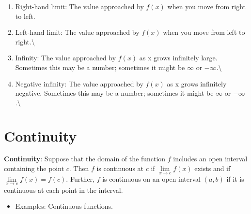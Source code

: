 \documentclass[]{book}
\providecommand{\tightlist}{%
  \setlength{\itemsep}{0pt}\setlength{\parskip}{0pt}}
\theoremstyle{definition}
\theoremstyle{definition}
\theoremstyle{definition}
\theoremstyle{remark}
\begin{document}
\begin{enumerate}
\def\labelenumi{\arabic{enumi}.}
\tightlist
\item
  Right-hand limit: The value approached by \(f(x)\) when you move from
  right to left.

  \begin{comment}
      \parbox[t]{2in}{Example:  $\lim\limits_{x\to 0^+} \sqrt{x} = 0$}\parbox[t]{1in}{\,  {\texttt{[image: sqrt.eps]}}}
      \end{comment}
\item
  Left-hand limit: The value approached by \(f(x)\) when you move from
  left to right.\textbackslash{}
\item
  Infinity: The value approached by \(f(x)\) as x grows infinitely
  large. Sometimes this may be a number; sometimes it might be
  \(\infty\) or \(-\infty\).\textbackslash{}
\item
  Negative infinity: The value approached by \(f(x)\) as x grows
  infinitely negative. Sometimes this may be a number; sometimes it
  might be \(\infty\) or \(-\infty\).\textbackslash{}
\end{enumerate}

\begin{comment}
\parbox[t]{2in}{Example:  $\lim\limits_{x\to \infty} 1/x = \lim\limits_{x\to -\infty} 1/x= 0$}\parbox[t]{1in}{\,  {\texttt{[image: 1ovrx.eps]}}}\\ 
\end{comment}

\section{Continuity}\label{continuity}

\textbf{Continuity}: Suppose that the domain of the function \(f\)
includes an open interval containing the point \(c\). Then \(f\) is
continuous at \(c\) if \(\lim\limits_{x \to c} f(x)\) exists and if
\(\lim\limits_{x \to c} f(x)=f(c)\). Further, \(f\) is continuous on an
open interval \((a,b)\) if it is continuous at each point in the
interval.

\begin{itemize}
\tightlist
\item
  Examples: Continuous functions.
\end{itemize}

\begin{comment}
    \parbox[t]{1.5in}{\hfill$f(x)=\sqrt{x}\quad$}\parbox[t]{1in}{\,  {\texttt{[image: sqrt.eps]}}}
    \parbox[t]{1.5in}{\hfill$f(x)=e^x\quad$}\parbox[t]{1in}{\,  {\texttt{[image: exp.eps]}}}
    \item[] Examples: Discontinuous functions.\\
    \parbox[t]{1.5in}{\hfill$f(x)=\mbox{floor}(x)\quad$}\parbox[t]{1in}{\,  {\texttt{[image: floor.eps]}}}
    \parbox[t]{1.5in}{\hfill$f(x)=1+\frac{1}{x^2}\quad$}\parbox[t]{1in}{\,  {\texttt{[image: 1p1ovrx2.eps]}}}
\end{comment}
\end{document}

